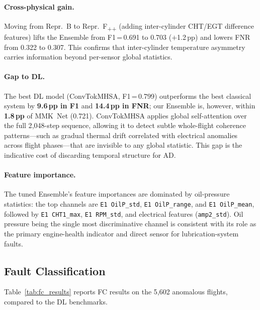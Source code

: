 \paragraph{Cross-physical gain.}
Moving from Repr.~B to Repr.~F\textsubscript{++} (adding inter-cylinder CHT/EGT
difference features) lifts the Ensemble from F1\,=\,0.691 to 0.703 ($+$1.2\,pp)
and lowers FNR from 0.322 to 0.307. This confirms that inter-cylinder temperature
asymmetry carries information beyond per-sensor global statistics.

\paragraph{Gap to DL.}
The best DL model (ConvTokMHSA, F1\,=\,0.799) outperforms the best classical
system by \textbf{9.6\,pp in F1} and \textbf{14.4\,pp in FNR}; our Ensemble is,
however, within \textbf{1.8\,pp} of MMK~Net (0.721). ConvTokMHSA applies global
self-attention over the full 2{,}048-step sequence, allowing it to detect subtle
whole-flight coherence patterns---such as gradual thermal drift correlated with
electrical anomalies across flight phases---that are invisible to any global
statistic. This gap is the indicative cost of discarding temporal structure for
AD.

\paragraph{Feature importance.}
The tuned Ensemble's feature importances are dominated by oil-pressure statistics:
the top channels are \texttt{E1 OilP\_std}, \texttt{E1 OilP\_range}, and
\texttt{E1 OilP\_mean}, followed by \texttt{E1 CHT1\_max}, \texttt{E1 RPM\_std},
and electrical features (\texttt{amp2\_std}). Oil pressure being the single most
discriminative channel is consistent with its role as the primary engine-health
indicator and direct sensor for lubrication-system faults.

\subsection{Fault Classification}
\label{subsec:results_fc}

Table~\ref{tab:fc_results} reports FC results on the 5{,}602 anomalous flights,
compared to the DL benchmarks.

